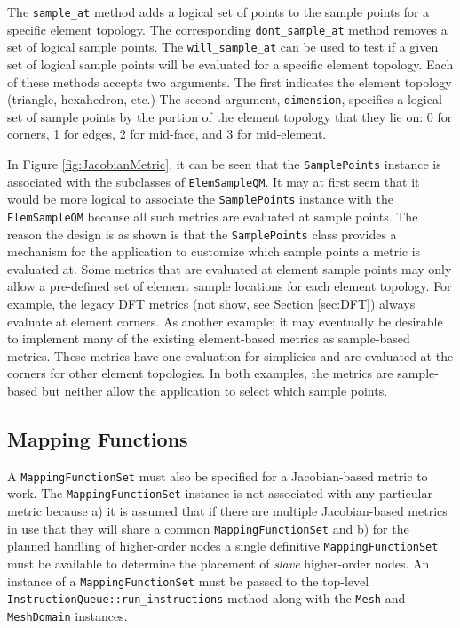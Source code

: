 \documentclass{article}
\begin{document}
The \texttt{sample\_at} method adds a logical set of points to the sample points for a specific element topology.  The corresponding \texttt{dont\_sample\_at} method removes a set of logical sample points.  The \texttt{will\_sample\_at} can be used to test if a given set of logical sample points will be evaluated for a specific element topology.  Each of these methods accepts two arguments.  The first indicates the element topology (triangle, hexahedron, etc.)  The second argument, \texttt{dimension}, specifies a logical set of sample points by the portion of the element topology that they lie on: 0 for corners, 1 for edges, 2 for mid-face, and 3 for mid-element.  

In Figure \ref{fig:JacobianMetric}, it can be seen that the \texttt{SamplePoints} instance is associated with the subclasses of \texttt{ElemSampleQM}.  It may at first seem that it would be more logical to associate the \texttt{SamplePoints} instance with the \texttt{ElemSampleQM} because all such metrics are evaluated at sample points.  The reason the design is as shown is that the \texttt{SamplePoints} class provides a mechanism for the application to customize which sample points a metric is evaluated at.  Some metrics that are evaluated at element sample points may only allow a pre-defined set of element sample locations for each element topology.  For example, the legacy DFT metrics (not show, see Section \ref{sec:DFT}) always evaluate at element corners.  As another example; it may eventually be desirable to implement many of the existing element-based metrics as sample-based metrics.  These metrics have one evaluation for simplicies and are evaluated at the corners for other element topologies.  In both examples, the metrics are sample-based but neither allow the application to select which sample points.

\subsection{Mapping Functions}

A \texttt{MappingFunctionSet} must also be specified for a Jacobian-based metric to work.  The \texttt{MappingFunctionSet} instance is not associated with any particular metric because a) it is assumed that if there are multiple Jacobian-based metrics in use that they will share a common \texttt{MappingFunctionSet} and b) for the planned handling of higher-order nodes a single definitive \texttt{MappingFunctionSet} must be available to determine the placement of \emph{slave} higher-order nodes.  An instance of a \texttt{MappingFunctionSet} must be passed to the top-level \texttt{InstructionQueue::run\_instructions} method along with the \texttt{Mesh} and \texttt{MeshDomain} instances.
\end{document}
